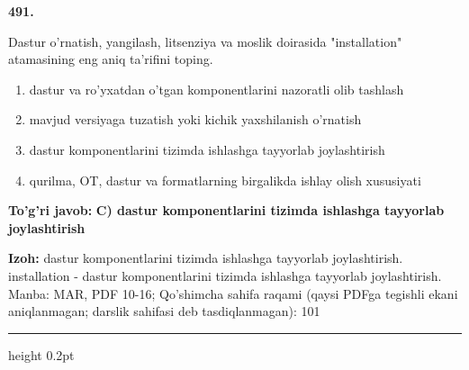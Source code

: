 \documentclass[10pt,a4paper]{article}
\begin{document}
{\bfseries\sffamily\color{ink} 491.}
\par
Dastur o'rnatish, yangilash, litsenziya va moslik doirasida "installation" atamasining eng aniq ta'rifini toping.
\begin{enumerate}[label=\Alph*),leftmargin=9mm]
\item dastur va ro'yxatdan o'tgan komponentlarini nazoratli olib tashlash
\item mavjud versiyaga tuzatish yoki kichik yaxshilanish o'rnatish
\item dastur komponentlarini tizimda ishlashga tayyorlab joylashtirish
\item qurilma, OT, dastur va formatlarning birgalikda ishlay olish xususiyati
\end{enumerate}
\begin{tcolorbox}[enhanced,breakable,colback=teal!4,colframe=teal!60!black,boxrule=0.45pt,arc=1.2mm,left=2.7mm,right=2.7mm,top=1.8mm,bottom=1.8mm,before skip=2mm,after skip=2mm]
{\bfseries\sffamily\color{teal}To'g'ri javob:} \textbf{C) dastur komponentlarini tizimda ishlashga tayyorlab joylashtirish}
\par\smallskip
{\bfseries Izoh:} dastur komponentlarini tizimda ishlashga tayyorlab joylashtirish. installation - dastur komponentlarini tizimda ishlashga tayyorlab joylashtirish. Manba: MAR, PDF 10-16; Qo'shimcha sahifa raqami (qaysi PDFga tegishli ekani aniqlanmagan; darslik sahifasi deb tasdiqlanmagan): 101
\end{tcolorbox}
\vspace{2mm}\hrule height 0.2pt\vspace{3mm}
\end{document}
